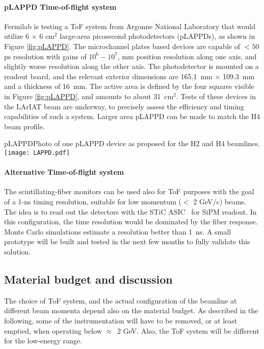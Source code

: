 \paragraph{pLAPPD Time-of-flight system}
Fermilab is testing a ToF system from Argonne National Laboratory that would utilize  
6 $\times$ 6 cm$^2$
large-area picosecond photodetectors (pLAPPDs), as shown in Figure \ref{fig:pLAPPD}.
 The microchannel plates based devices
are capable of $< 50$ ps resolution with gains of $10^6-10^7$,
mm position resolution along one axis, and slightly worse resolution
along the other axis.  The photodetector is mounted on a readout
board, and the relevant exterior dimensions are 165.1~mm $\times$ 109.3~mm and a
thickness of 16~mm. The active area is defined by the four squares visible in Figure \ref{fig:pLAPPD}, and amounts to about 31~cm$^2$. Tests of these devices in the LArIAT beam are underway, to precisely assess the efficiency and timing capabilities of such a system. Larger area pLAPPD can be made to match the H4 beam profile.
\begin{cdrfigure}[pLAPPD]{pLAPPD}{Photo of one pLAPPD device as proposed for the H2 and H4 beamlines.}
\texttt{[image: LAPPD.pdf]}
\end{cdrfigure}

\paragraph{Alternative Time-of-flight system}
The  scintillating-fiber monitors can be used also for ToF purposes with the goal of a 1-ns timing resolution, suitable for low momentum ($<$ 2 GeV/c) beams. 
The idea is to read out the detectors with the STiC ASIC~\cite{STIC} for SiPM readout. 
In this configuration, the time resolution would be dominated by the fiber response. Monte Carlo simulations estimate a resolution better than 1~ns. 
A small prototype will be built and tested in the next few months to fully validate this solution.

\subsection{Material budget and discussion}
\label{beam-material-budget}

The choice of ToF system, and the actual configuration of the beamline at different beam momenta  depend also on the material budget. 
As described in the following, some of the instrumentation will have to be removed, or at least emptied, when operating below $\approx$~2 GeV. Also, the ToF system will be different for the low-energy range.

